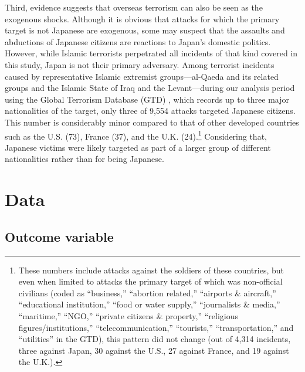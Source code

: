 \documentclass[letterpaper,12pt]{scrartcl}
\begin{document}
Third, evidence suggests that overseas terrorism can also be seen as the exogenous shocks. Although it is obvious that attacks for which the primary target is not Japanese are exogenous, some may suspect that the assaults and abductions of Japanese citizens are reactions to Japan's domestic politics. However, while Islamic terrorists perpetrated all incidents of that kind covered in this study, Japan is not their primary adversary. Among terrorist incidents caused by representative Islamic extremist groups---al-Qaeda and its related groups and the Islamic State of Iraq and the Levant---during our analysis period using the Global Terrorism Database (GTD) \citep{START2022}, which records up to three major nationalities of the target, only three of 9,554 attacks targeted Japanese citizens. This number is considerably minor compared to that of other developed countries such as the U.S. (73), France (37), and the U.K. (24).\footnote{These numbers include attacks against the soldiers of these countries, but even when limited to attacks the primary target of which was non-official civilians (coded as ``business,'' ``abortion related,'' ``airports \& aircraft,'' ``educational institution,'' ``food or water supply,'' ``journalists \& media,'' ``maritime,'' ``NGO,'' ``private citizens \& property,'' ``religious figures/institutions,'' ``telecommunication,'' ``tourists,'' ``transportation,'' and ``utilities'' in the GTD), this pattern did not change (out of 4,314 incidents, three against Japan, 30 against the U.S., 27 against France, and 19 against the U.K.).} Considering that, Japanese victims were likely targeted as part of a larger group of different nationalities rather than for being Japanese.

\section*{Data\centering}

\subsection*{Outcome variable}
\end{document}

